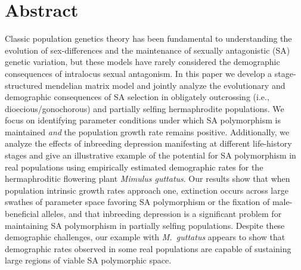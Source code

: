 \documentclass[11pt]{article}
\begin{document}
\newpage{}
\section*{Abstract}%

Classic population genetics theory has been fundamental to understanding the evolution of sex-differences and the maintenance of sexually antagonistic (SA) genetic variation, but these models have rarely considered the demographic consequences of intralocus sexual antagonism. In this paper we develop a stage-structured mendelian matrix model and jointly analyze the evolutionary and demographic consequences of SA selection in obligately outcrossing (i.e., dioecious/gonochorous) and partially selfing hermaphrodite populations. We focus on identifying parameter conditions under which SA polymorphism is maintained {\itshape and} the population growth rate remains positive. Additionally, we analyze the effects of inbreeding depression manifesting at different life-history stages and give an illustrative example of the potential for SA polymorphism in real populations using empirically estimated demographic rates for the hermaphroditic flowering plant {\itshape Mimulus guttatus}. Our results show that when population intrinsic growth rates approach one, extinction occurs across large swathes of parameter space favoring SA polymorphism or the fixation of male-beneficial alleles, and that inbreeding depression is a significant problem for maintaining SA polymorphism in partially selfing populations. Despite these demographic challenges, our example with {\itshape M.~guttatus} appears to show that demographic rates observed in some real populations are capable of sustaining large regions of viable SA polymorphic space.
\end{document}
